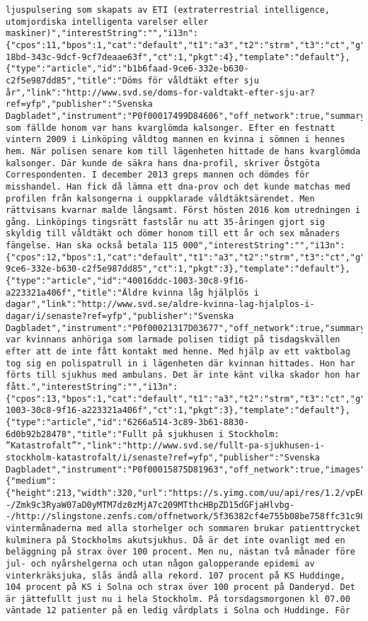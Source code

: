 \begin{verbatim}
ljuspulsering som skapats av ETI (extraterrestrial intelligence, utomjordiska intelligenta varelser eller maskiner)","interestString":"","i13n":{"cpos":11,"bpos":1,"cat":"default","t1":"a3","t2":"strm","t3":"ct","g":"09f57048-18bd-343c-9dcf-9cf7deaae63f","ct":1,"pkgt":4},"template":"default"},{"type":"article","id":"b1b6faad-9ce6-332e-b630-c2f5e987dd85","title":"Döms för våldtäkt efter sju år","link":"http://www.svd.se/doms-for-valdtakt-efter-sju-ar?ref=yfp","publisher":"Svenska Dagbladet","instrument":"P0f00017499D84606","off_network":true,"summary":"Det som fällde honom var hans kvarglömda kalsonger. Efter en festnatt vintern 2009 i Linköping våldtog mannen en kvinna i sömnen i hennes hem. När polisen senare kom till lägenheten hittade de hans kvarglömda kalsonger. Där kunde de säkra hans dna-profil, skriver Östgöta Correspondenten. I december 2013 greps mannen och dömdes för misshandel. Han fick då lämna ett dna-prov och det kunde matchas med profilen från kalsongerna i ouppklarade våldtäktsärendet. Men rättvisans kvarnar malde långsamt. Först hösten 2016 kom utredningen i gång. Linköpings tingsrätt fastslår nu att 35-åringen gjort sig skyldig till våldtäkt och dömer honom till ett år och sex månaders fängelse. Han ska också betala 115 000","interestString":"","i13n":{"cpos":12,"bpos":1,"cat":"default","t1":"a3","t2":"strm","t3":"ct","g":"b1b6faad-9ce6-332e-b630-c2f5e987dd85","ct":1,"pkgt":3},"template":"default"},{"type":"article","id":"40016ddc-1003-30c8-9f16-a223321a406f","title":"Äldre kvinna låg hjälplös i dagar","link":"http://www.svd.se/aldre-kvinna-lag-hjalplos-i-dagar/i/senaste?ref=yfp","publisher":"Svenska Dagbladet","instrument":"P0f00021317D03677","off_network":true,"summary":"Det var kvinnans anhöriga som larmade polisen tidigt på tisdagskvällen efter att de inte fått kontakt med henne. Med hjälp av ett vaktbolag tog sig en polispatrull in i lägenheten där kvinnan hittades. Hon har förts till sjukhus med ambulans. Det är inte känt vilka skador hon har fått.","interestString":"","i13n":{"cpos":13,"bpos":1,"cat":"default","t1":"a3","t2":"strm","t3":"ct","g":"40016ddc-1003-30c8-9f16-a223321a406f","ct":1,"pkgt":3},"template":"default"},{"type":"article","id":"6266a514-3c89-3b61-8830-6d0b92b28478","title":"Fullt på sjukhusen i Stockholm: ”Katastrofalt”","link":"http://www.svd.se/fullt-pa-sjukhusen-i-stockholm-katastrofalt/i/senaste?ref=yfp","publisher":"Svenska Dagbladet","instrument":"P0f00015875D81963","off_network":true,"images":{"medium":{"height":213,"width":320,"url":"https://s.yimg.com/uu/api/res/1.2/vpECVeuvUICEqh6gFflSoA--/Zmk9c3RyaW07aD0yMTM7dz0zMjA7c209MTthcHBpZD15dGFjaHlvbg--/http://slingstone.zenfs.com/offnetwork/5f36382cf4e755b08be758ffc31c9855","defer":1}},"template":"featured","summary":"Under vintermånaderna med alla storhelger och sommaren brukar patienttrycket kulminera på Stockholms akutsjukhus. Då är det inte ovanligt med en beläggning på strax över 100 procent. Men nu, nästan två månader före jul- och nyårshelgerna och utan någon galopperande epidemi av vinterkräksjuka, slås ändå alla rekord. 107 procent på KS Huddinge, 104 procent på KS i Solna och strax över 100 procent på Danderyd. Det är jättefullt just nu i hela Stockholm. På torsdagsmorgonen kl 07.00 väntade 12 patienter på en ledig vårdplats i Solna och Huddinge. För 
\end{verbatim}
